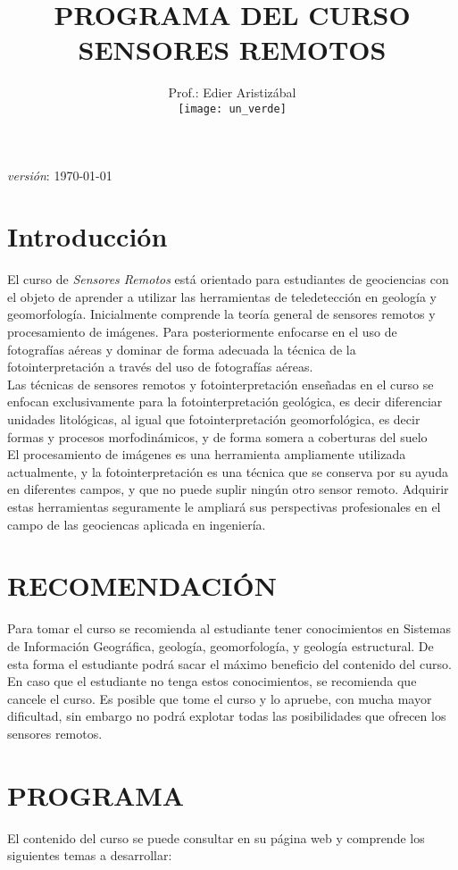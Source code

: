 \documentclass[a4paper,twoside,11pt,]{article}
\title {PROGRAMA  DEL CURSO SENSORES REMOTOS}
\author{Prof.: Edier Aristizábal\\[5ex]
\texttt{[image: un\_verde]}
}
\date{}
\begin{document}
\maketitle

\emph {versión}: \today

\section* {Introducción}
El curso de \emph{Sensores Remotos} está orientado para estudiantes de geociencias con el objeto de aprender a utilizar las herramientas de teledetección en geología y geomorfología. Inicialmente comprende la teoría general de sensores remotos y procesamiento de imágenes. Para posteriormente enfocarse en el uso de fotografías aéreas y dominar de forma adecuada la técnica de la fotointerpretación a través del uso de fotografías aéreas.\\ 
Las técnicas de sensores remotos y fotointerpretación enseñadas en el curso se enfocan exclusivamente para la fotointerpretación geológica, es decir diferenciar unidades litológicas, al igual que fotointerpretación geomorfológica, es decir formas y procesos morfodinámicos, y de forma somera a coberturas del suelo\\
El procesamiento de imágenes es una herramienta ampliamente utilizada actualmente, y la fotointerpretación es una técnica que se conserva por su ayuda en diferentes campos, y que no puede suplir ningún otro sensor remoto. Adquirir estas herramientas seguramente le ampliará sus perspectivas profesionales en el campo de las geociencas aplicada en ingeniería.

\section{RECOMENDACIÓN}
Para tomar el curso se recomienda al estudiante tener conocimientos en Sistemas de Información Geográfica, geología, geomorfología, y geología estructural. De esta forma el estudiante podrá sacar el máximo beneficio del contenido del curso.\\
En caso que el estudiante no tenga estos conocimientos, se recomienda que cancele el curso. Es posible que tome el curso y lo apruebe, con mucha mayor dificultad, sin embargo no podrá explotar todas las posibilidades que ofrecen los sensores remotos.

\section{PROGRAMA}
El contenido del curso se puede consultar en su página web  y comprende los siguientes temas a desarrollar:\\
\end{document}
